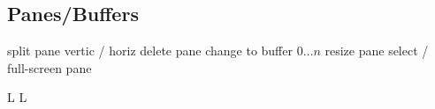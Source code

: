 \subsection{Panes/Buffers}{}
	{split pane vertic / horiz}
	{delete pane}
	{change to buffer $0 \ldots n$}
	{resize pane}
	{select / full-screen pane}

\copyrightnotice

\supereject
\if L\lr \else\null\vfill\eject\fi
\if L\lr \else\null\vfill\eject\fi
\bye

